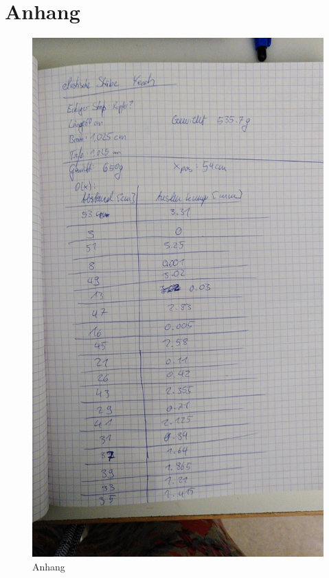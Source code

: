 \section{Anhang}

\begin{figure}
    \centering
    \includegraphics[scale=0.8]{an1.jpeg}
    \caption{Anhang}
    \label{fig:fick}
\end{figure}

